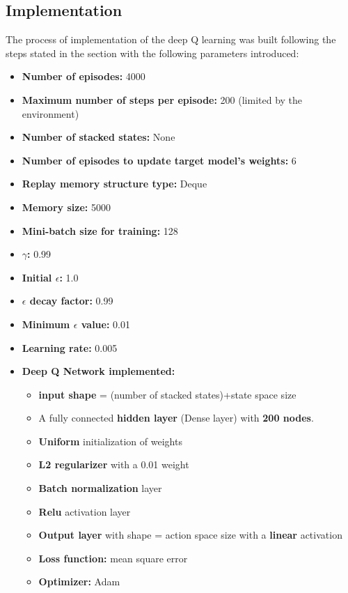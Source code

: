 \subsection{Implementation}

The process of implementation of the deep Q learning was built following the steps stated in the  section with the following parameters introduced:
\begin{itemize}
\item \textbf{Number of episodes:} 4000
\item \textbf{Maximum number of steps per episode:} 200 (limited by the environment)
\item \textbf{Number of stacked states:} None
\item \textbf{Number of episodes to update target model's weights:} 6
\item \textbf{Replay memory structure type:} Deque
\item \textbf{Memory size:} 5000
\item \textbf{Mini-batch size for training:} 128
\item \textbf{$\gamma$:} 0.99
\item \textbf{Initial $\epsilon$:} 1.0
\item \textbf{$\epsilon$ decay factor:} 0.99
\item \textbf{Minimum $\epsilon$ value:} 0.01
\item \textbf{Learning rate:} 0.005
\item \textbf{Deep Q Network implemented:}
    \begin{itemize}
    \item \textbf{input shape} = (number of stacked states)+state space size
    \item A fully connected \textbf{hidden layer} (Dense layer) with \textbf{200 nodes}.
    \item \textbf{Uniform} initialization of weights 
    \item \textbf{L2 regularizer} with a 0.01 weight
    \item \textbf{Batch normalization} layer
    \item \textbf{Relu} activation layer
    \item \textbf{Output layer} with shape = action space size with a \textbf{linear} activation
    \item \textbf{Loss function:} mean square error
    \item \textbf{Optimizer: } Adam
    \end{itemize}
\end{itemize}


